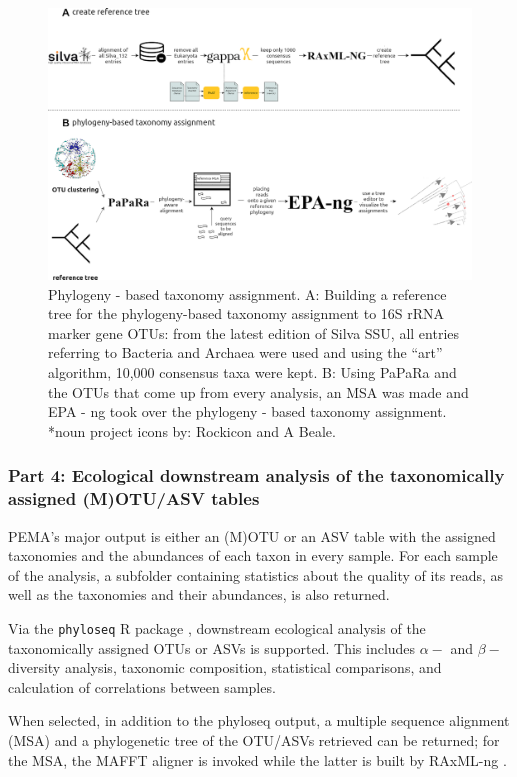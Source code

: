    \begin{figure}[h]
      \centering
      \includegraphics[width=115mm]{figures/pema_phylogenetic_tree.jpeg}
      \caption{
         Phylogeny - based taxonomy assignment. 
         A: Building a reference tree for the phylogeny-based taxonomy assignment to 16S rRNA marker gene OTUs: from the latest edition of Silva SSU, all entries referring to Bacteria and Archaea were used and using the “art” algorithm, 10,000 consensus taxa were kept. 
         B: Using PaPaRa and the OTUs that come up from every analysis, an MSA was made and EPA - ng took over the phylogeny - based taxonomy assignment. *noun project icons by: Rockicon and A Beale.
      }
   \end{figure}

   \subsubsection*{Part 4: Ecological downstream analysis of the taxonomically assigned (M)OTU/ASV tables}

   PEMA's major output is either an (M)OTU or an ASV table with the assigned taxonomies and the abundances of each taxon in every sample. 
   For each sample of the analysis, a subfolder containing statistics about the quality of its reads, as well as the taxonomies and their abundances, is also returned.

   Via the \texttt{phyloseq} R package \citep{mcmurdie2013phyloseq}, downstream ecological analysis of the taxonomically assigned OTUs or ASVs is supported. 
   This includes $\alpha-$ and $\beta-$diversity analysis, taxonomic composition, statistical comparisons, and calculation of correlations between samples.

   When selected, in addition to the phyloseq \citep{mcmurdie2013phyloseq} output, a multiple sequence alignment (MSA) and a phylogenetic tree of the OTU/ASVs retrieved can be returned; 
   for the MSA, the MAFFT \citep{katoh2002mafft, nakamura2018parallelization} aligner is invoked while the latter is built by RAxML-ng \citep{kozlov2019raxml}.


